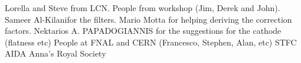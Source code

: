 \documentclass[a4paper,11pt]{article}
\begin{document}
\acknowledgments
Lorella and Steve from LCN.
People from workshop (Jim, Derek and John). Sameer Al-Kilanifor the filters.
Mario Motta for helping deriving the correction factors. 
Nektarios A. PAPADOGIANNIS for the suggestions for the cathode (flatness etc)
People at FNAL and CERN (Francesco, Stephen, Alan, etc)
STFC
AIDA
Anna's Royal Society



\begingroup
    \setlength{\bibsep}{10pt}
    
\endgroup
\end{document}
